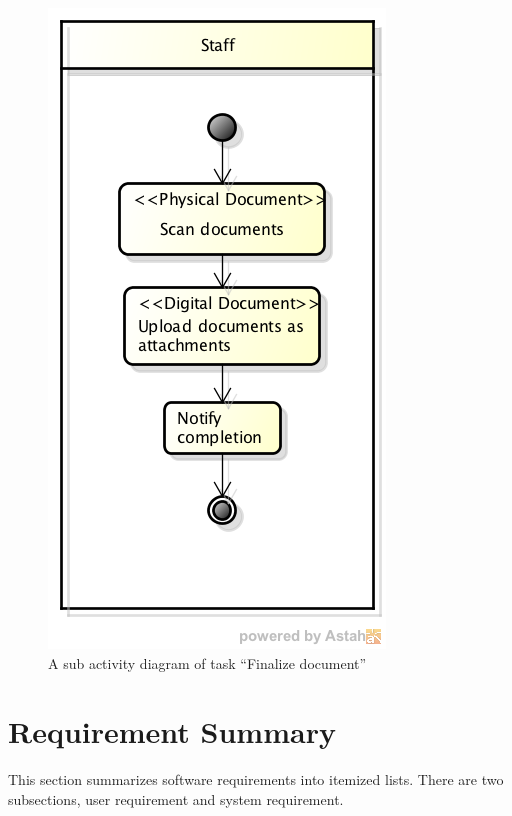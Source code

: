 \begin{figure}
	\centering
	\caption{A sub activity diagram of task \enquote{Finalize document}}
	\label{fig:diagram-finalize-document}
	\includegraphics[scale=0.5]{res/requirement/finalize_document}
\end{figure}

\section{Requirement Summary}
This section summarizes software requirements into itemized lists.
There are two subsections, user requirement and system requirement.

